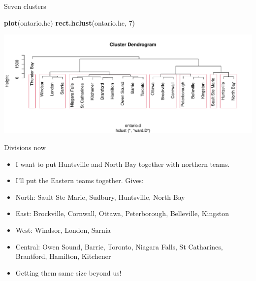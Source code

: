 \documentclass[
  ignorenonframetext,
]{beamer}
\newenvironment{Shaded}{\begin{snugshade}}{\end{snugshade}}
\newcommand{\DecValTok}[1]{\textcolor[rgb]{0.00,0.00,0.81}{#1}}
\newcommand{\KeywordTok}[1]{\textcolor[rgb]{0.13,0.29,0.53}{\textbf{#1}}}
\newcommand{\NormalTok}[1]{#1}
\begin{document}
\begin{frame}[fragile]{Seven clusters}
\protect\hypertarget{seven-clusters}{}

\begin{Shaded}
\begin{Highlighting}[]
\KeywordTok{plot}\NormalTok{(ontario.hc)}
\KeywordTok{rect.hclust}\NormalTok{(ontario.hc, }\DecValTok{7}\NormalTok{)}
\end{Highlighting}
\end{Shaded}

\includegraphics{slides_d29_files/figure-beamer/unnamed-chunk-419-1.pdf}

\end{frame}

\begin{frame}{Divisions now}
\protect\hypertarget{divisions-now}{}

\begin{itemize}
\item
  I want to put Huntsville and North Bay together with northern teams.
\item
  I'll put the Eastern teams together. Gives:
\item
  North: Sault Ste Marie, Sudbury, Huntsville, North Bay
\item
  East: Brockville, Cornwall, Ottawa, Peterborough, Belleville, Kingston
\item
  West: Windsor, London, Sarnia
\item
  Central: Owen Sound, Barrie, Toronto, Niagara Falls, St Catharines,
  Brantford, Hamilton, Kitchener
\item
  Getting them same size beyond us!
\end{itemize}

\end{frame}
\end{document}
